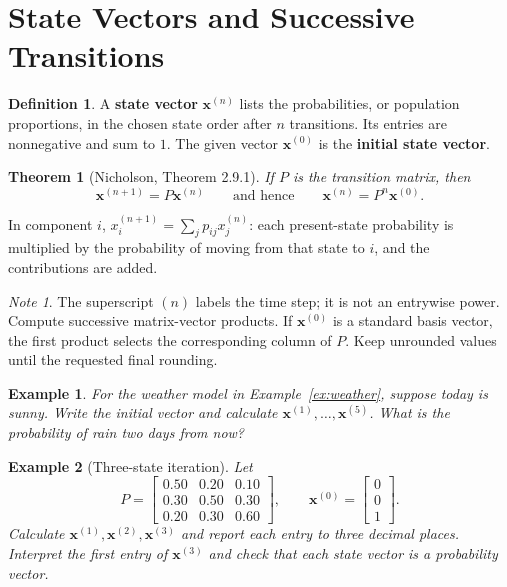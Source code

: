 \documentclass{article}
\theoremstyle{plain}
\newtheorem{theorem}{Theorem}[section]
\newtheorem{example}{Example}[section]
\theoremstyle{definition}
\newtheorem{definition}{Definition}[section]
\theoremstyle{remark}
\newtheorem*{note}{Note}
\renewcommand{\vec}[1]{\mathbf{#1}}
\newcommand{\work}{\par\vfill}
\begin{document}
\section{State Vectors and Successive Transitions}
\begin{definition}
A \textbf{state vector} $\vec{x}^{(n)}$ lists the probabilities, or population proportions, in the chosen state order after $n$ transitions. Its entries are nonnegative and sum to $1$. The given vector $\vec{x}^{(0)}$ is the \textbf{initial state vector}.
\end{definition}
\begin{theorem}[Nicholson, Theorem 2.9.1]
If $P$ is the transition matrix, then
\[
\boxed{\vec{x}^{(n+1)}=P\vec{x}^{(n)}}\qquad\text{and hence}\qquad
\boxed{\vec{x}^{(n)}=P^n\vec{x}^{(0)}}.
\]
\end{theorem}
In component $i$, $x_i^{(n+1)}=\sum_j p_{ij}x_j^{(n)}$: each present-state probability is multiplied by the probability of moving from that state to $i$, and the contributions are added.
\begin{note}
The superscript $(n)$ labels the time step; it is not an entrywise power. Compute successive matrix-vector products. If $\vec{x}^{(0)}$ is a standard basis vector, the first product selects the corresponding column of $P$. Keep unrounded values until the requested final rounding.
\end{note}
\begin{example}\label{ex:iterate2}
For the weather model in Example~\ref{ex:weather}, suppose today is sunny. Write the initial vector and calculate $\vec{x}^{(1)},\ldots,\vec{x}^{(5)}$. What is the probability of rain two days from now?
\end{example}

\work

\newpage
\begin{example}[Three-state iteration]\label{ex:iterate3}
Let
\[
P=\begin{bmatrix}0.50&0.20&0.10\\0.30&0.50&0.30\\0.20&0.30&0.60\end{bmatrix},\qquad
\vec{x}^{(0)}=\begin{bmatrix}0\\0\\1\end{bmatrix}.
\]
Calculate $\vec{x}^{(1)},\vec{x}^{(2)},\vec{x}^{(3)}$ and report each entry to three decimal places. Interpret the first entry of $\vec{x}^{(3)}$ and check that each state vector is a probability vector.
\end{example}
\end{document}
